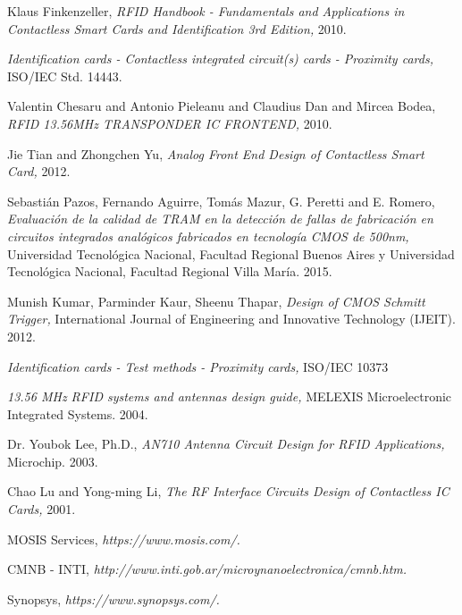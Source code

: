 \documentclass[a4paper, 10pt, conference]{ieeeconf}      %
\begin{document}
\begin{thebibliography}{99}

Klaus Finkenzeller,
\textit{RFID Handbook - Fundamentals and Applications
in Contactless Smart Cards and Identification 3rd Edition,}
2010.

\textit{Identification cards - Contactless integrated circuit(s) cards - Proximity
cards,}
ISO/IEC Std. 14443.

Valentin Chesaru and Antonio Pieleanu and Claudius Dan and Mircea
Bodea,
\textit{RFID 13.56MHz TRANSPONDER IC FRONTEND,}
2010.

Jie Tian and Zhongchen Yu,
\textit{Analog Front End Design of Contactless Smart Card,}
2012.


Sebastián Pazos, Fernando Aguirre, Tomás Mazur, G. Peretti and E. Romero,
\textit{Evaluación de la calidad de TRAM en la detección de fallas de fabricación en circuitos integrados analógicos fabricados en tecnología CMOS de 500nm,}
Universidad Tecnológica Nacional, Facultad Regional Buenos Aires y Universidad Tecnológica Nacional, Facultad Regional Villa María. 2015.

Munish Kumar, Parminder Kaur, Sheenu Thapar,
\textit{Design of CMOS Schmitt Trigger,}
International Journal of Engineering and Innovative Technology (IJEIT). 2012.


\textit{Identification cards - Test methods - Proximity cards,}
ISO/IEC 10373

\textit{13.56 MHz RFID systems and antennas design guide,}
MELEXIS Microelectronic Integrated Systems. 2004.


Dr. Youbok Lee, Ph.D.,
\textit{AN710 Antenna Circuit Design for RFID Applications,}
Microchip. 2003.

Chao Lu and Yong-ming Li,
\textit{The RF Interface Circuits Design of
Contactless IC Cards,}
2001.

MOSIS Services,
\textit{https://www.mosis.com/.}

CMNB - INTI,
\textit{http://www.inti.gob.ar/microynanoelectronica/cmnb.htm.}

Synopsys,
\textit{https://www.synopsys.com/.}


\end{thebibliography}
\end{document}
